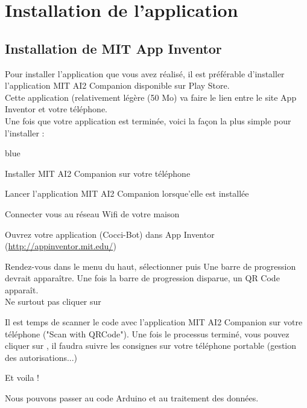 \chapter{Installation de l'application}

\section{Installation de MIT App Inventor}

Pour installer l'application que vous avez réalisé, il est préférable d'installer l'application MIT AI2 Companion disponible sur Play Store. \\
Cette application (relativement légère (50 Mo) va faire le lien entre le site App Inventor et votre téléphone. \\
Une fois que votre application est terminée, voici la façon la plus simple pour l'installer : 


\begin{items}{blue}{\Triangle}
    \item Installer MIT AI2 Companion sur votre téléphone 
    \item Lancer l'application MIT AI2 Companion lorsque'elle est installée 
    \item Connecter vous au réseau Wifi de votre maison 
    \item Ouvrez votre application (Cocci-Bot) dans App Inventor (\url{http://appinventor.mit.edu/}) 
    \item Rendez-vous dans le menu du haut, sélectionner  puis 
    Une barre de progression devrait apparaître.
    Une fois la barre de progression disparue, un QR Code apparaît. \\ {\color{red}Ne surtout pas cliquer sur }
    
   \item Il est temps de scanner le code avec l'application MIT AI2 Companion sur votre téléphone ("Scan with QRCode"). Une fois le processus terminé, vous pouvez cliquer sur , il faudra suivre les consignes sur votre téléphone portable (gestion des autorisations...)
   \item Et voila !
    
\end{items}

Nous pouvons passer au code Arduino et au traitement des données.